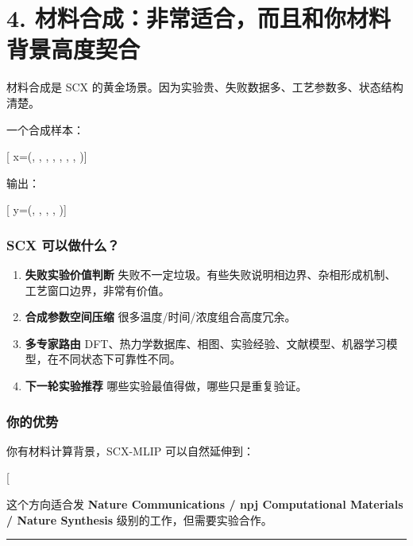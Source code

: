 \documentclass[
  12pt,
]{ctexart}
\begin{document}
\section{4.
材料合成：非常适合，而且和你材料背景高度契合}\label{ux6750ux6599ux5408ux6210ux975eux5e38ux9002ux5408ux800cux4e14ux548cux4f60ux6750ux6599ux80ccux666fux9ad8ux5ea6ux5951ux5408}

材料合成是 SCX
的黄金场景。因为实验贵、失败数据多、工艺参数多、状态结构清楚。

一个合成样本：

{[} x=(, , ,
, , , ,
){]}

输出：

{[} y=(, , , ,
){]}

\subsubsection{SCX
可以做什么？}\label{scx-ux53efux4ee5ux505aux4ec0ux4e48}

\begin{enumerate}
\def\labelenumi{\arabic{enumi}.}
\item
  \textbf{失败实验价值判断}
  失败不一定垃圾。有些失败说明相边界、杂相形成机制、工艺窗口边界，非常有价值。
\item
  \textbf{合成参数空间压缩} 很多温度/时间/浓度组合高度冗余。
\item
  \textbf{多专家路由}
  DFT、热力学数据库、相图、实验经验、文献模型、机器学习模型，在不同状态下可靠性不同。
\item
  \textbf{下一轮实验推荐} 哪些实验最值得做，哪些只是重复验证。
\end{enumerate}

\subsubsection{你的优势}\label{ux4f60ux7684ux4f18ux52bf}

你有材料计算背景，SCX-MLIP 可以自然延伸到：

{[}  \rightarrow \text{合成实验数据价值}{]}

这个方向适合发 \textbf{Nature Communications / npj Computational
Materials / Nature Synthesis} 级别的工作，但需要实验合作。

\begin{center}\rule{0.5\linewidth}{0.5pt}\end{center}
\end{document}

